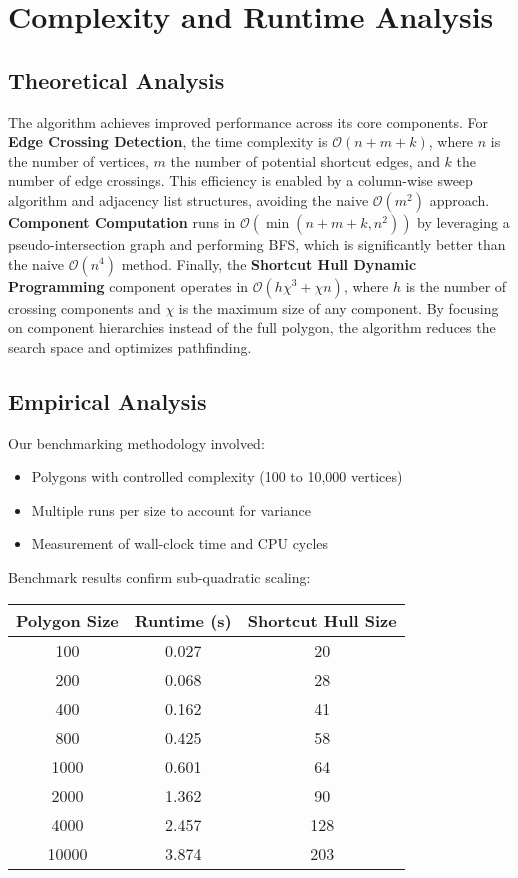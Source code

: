 \documentclass[11pt]{article}
\begin{document}
\section{Complexity and Runtime Analysis}

\subsection{Theoretical Analysis}
The algorithm achieves improved performance across its core components. For \textbf{Edge Crossing Detection}, the time complexity is $\mathcal{O}(n + m + k)$, where $n$ is the number of vertices, $m$ the number of potential shortcut edges, and $k$ the number of edge crossings. This efficiency is enabled by a column-wise sweep algorithm and adjacency list structures, avoiding the naive $\mathcal{O}(m^2)$ approach. \textbf{Component Computation} runs in $\mathcal{O}(\min(n + m + k, n^2))$ by leveraging a pseudo-intersection graph and performing BFS, which is significantly better than the naive $\mathcal{O}(n^4)$ method. Finally, the \textbf{Shortcut Hull Dynamic Programming} component operates in $\mathcal{O}(h\chi^3 + \chi n)$, where $h$ is the number of crossing components and $\chi$ is the maximum size of any component. By focusing on component hierarchies instead of the full polygon, the algorithm reduces the search space and optimizes pathfinding.

\subsection{Empirical Analysis}
Our benchmarking methodology involved:
\begin{itemize}[leftmargin=*, noitemsep]
  \item Polygons with controlled complexity (100 to 10,000 vertices)
  \item Multiple runs per size to account for variance
  \item Measurement of wall-clock time and CPU cycles
\end{itemize}

Benchmark results confirm sub-quadratic scaling:

\begin{table}[h]
\centering
\begin{tabular}{ccc}
\toprule
Polygon Size & Runtime (s) & Shortcut Hull Size \\
\midrule
100 & 0.027 & 20 \\
200 & 0.068 & 28 \\
400 & 0.162 & 41 \\
800 & 0.425 & 58 \\
1000 & 0.601 & 64 \\
2000 & 1.362 & 90 \\
4000 & 2.457 & 128 \\
10000 & 3.874 & 203 \\
\bottomrule
\end{tabular}
\end{table}
\end{document}
